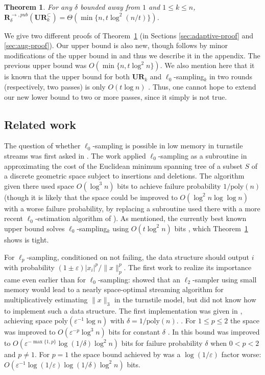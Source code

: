 \documentclass[11pt]{article}
\newtheorem{theorem}{Theorem}
\newcommand{\eps}{\varepsilon}
\newcommand{\ur}{\mathbf{UR}\xspace}
\newcommand{\randcom}{\mathbf{R}}
\newcommand{\poly}{{\mathrm{poly}}}
\begin{document}
\begin{theorem}\label{thm:main}
For any $\delta$ bounded away from $1$ and $1\le k\le n$, $\randcom^{\rightarrow,pub}_\delta(\ur_k^\subset) = \Theta(\min\{n, t\log^2(n/t)\})$.
\end{theorem}

We give two different proofs of Theorem~\ref{thm:main} (in Sections \ref{sec:adaptive-proof} and \ref{sec:aug-proof}). Our upper bound is also new, though follows by minor modifications of the upper bound in \cite{JowhariST11} and thus we describe it in the appendix. The previous upper bound was $O(\min\{n, t\log^2 n\})$. We also mention here that it is known that the upper bound for both $\ur_k$ and $\ell_0$-sampling$_k$ in two rounds (respectively, two passes) is only $O(t\log n)$ \cite{JowhariST11}. Thus, one cannot hope to extend our new lower bound to two or more passes, since it simply is not true.


\subsection{Related work}
The question of whether $\ell_0$-sampling is possible in low memory in turnstile streams was first asked in \cite{CormodeMR05,FrahlingIS08}. The work \cite{FrahlingIS08} applied $\ell_0$-sampling as a subroutine in approximating the cost of the Euclidean minimum spanning tree of a subset $S$ of a discrete geometric space subject to insertions and deletions. The algorithm given there used space $O(\log^3 n)$ bits to achieve failure probability $1/\poly(n)$ (though it is likely that the space could be improved to $O(\log^2 n\log\log n)$ with a worse failure probability, by replacing a subroutine used there with a more recent $\ell_0$-estimation algorithm of \cite{KaneNW10}). As mentioned, the currently best known upper bound solves $\ell_0$-sampling$_k$ using $O(t\log^2 n)$ bits \cite{JowhariST11}, which Theorem~\ref{thm:main} shows is tight.

For $\ell_p$-sampling, conditioned on not failing, the data structure should output $i$ with probability $(1\pm\eps)|x_i|^p/\|x\|_p^p$. The first work to realize its importance came even earlier than for $\ell_0$-sampling: \cite{CoppersmithK04} showed that an $\ell_2$-sampler using small memory would lead to a nearly space-optimal streaming algorithm for multiplicatively estimating $\|x\|_3$ in the turnstile model, but did not know how to implement such a data structure. The first implementation was given in \cite{MonemizadehW10}, achieving space $\poly(\eps^{-1}\log n)$ with $\delta = 1/\poly(n)$. . For $1\le p\le 2$ the space was improved to $O(\eps^{-p}\log^3 n)$ bits for constant $\delta$ \cite{AndoniKO11}. In \cite{JowhariST11} this bound was improved to $O(\eps^{-\max\{1,p\}}\log(1/\delta)\log^2 n)$ bits for failure probability $\delta$ when $0<p<2$ and $p\neq 1$. For $p=1$ the space bound achieved by \cite{JowhariST11} was a $\log(1/\eps)$ factor worse: $O(\eps^{-1}\log(1/\eps)\log(1/\delta)\log^2 n)$ bits.
\end{document}
